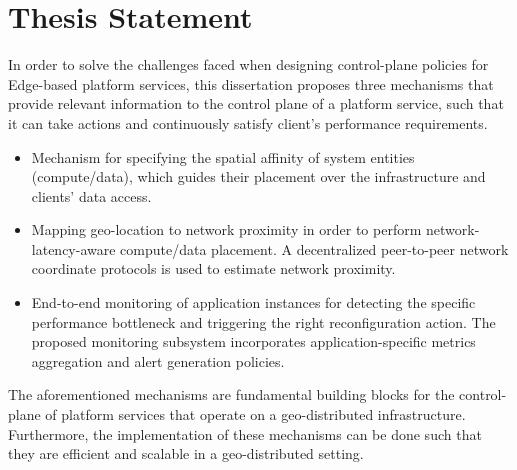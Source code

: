 \section{Thesis Statement}
In order to solve the challenges faced when designing control-plane policies for Edge-based platform services, this dissertation proposes three mechanisms that provide relevant information to the control plane of a platform service, such that it can take actions and continuously satisfy client's performance requirements.
\begin{itemize}
\item Mechanism for specifying the spatial affinity of system entities (compute/data), which guides their placement over the infrastructure and clients' data access. 
\item Mapping geo-location to network proximity in order to perform network-latency-aware compute/data placement. A decentralized peer-to-peer network coordinate protocols is used to estimate network proximity.
\item End-to-end monitoring of application instances for detecting the specific performance bottleneck and triggering the right reconfiguration action. The proposed monitoring subsystem incorporates application-specific metrics aggregation and alert generation policies. 
\end{itemize}

The aforementioned mechanisms are fundamental building blocks for the control-plane of platform services that operate on a geo-distributed infrastructure. Furthermore, the implementation of these mechanisms can be done such that they are efficient and scalable in a geo-distributed setting. 

